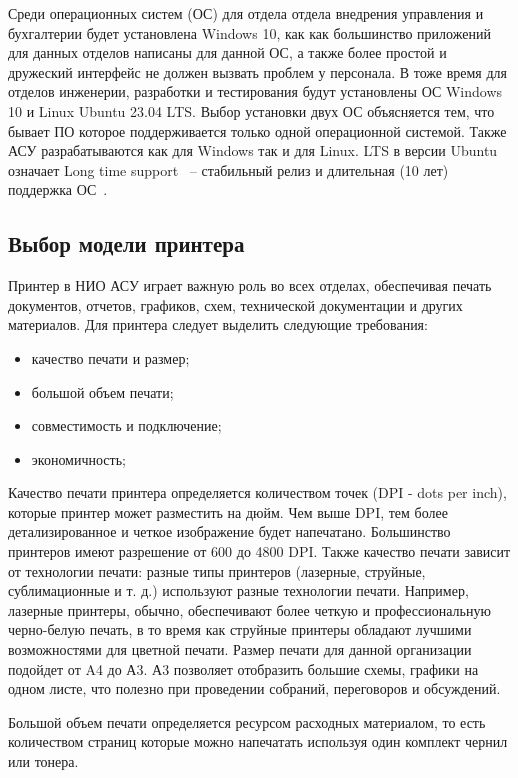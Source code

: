 Среди операционных систем (ОС) для отдела отдела внедрения управления и бухгалтерии будет установлена Windows 10, как как большинство приложений для данных 
отделов написаны для данной ОС, а также более простой и дружеский интерфейс не должен вызвать проблем у персонала. 
В тоже время для отделов инженерии, разработки и тестирования будут установлены ОС Windows 10 и Linux Ubuntu 23.04 LTS. Выбор установки двух ОС объясняется тем,
что бывает ПО которое поддерживается только одной операционной системой. Также АСУ разрабатываются как для Windows так и для Linux. LTS в версии Ubuntu означает 
Long time support ~-- стабильный релиз и длительная (10 лет) поддержка ОС~\cite{ubuntu}.

\subsection{Выбор модели принтера}

Принтер в НИО АСУ играет важную роль во всех отделах, 
обеспечивая печать документов, отчетов, графиков, схем, технической документации и других материалов.
Для принтера следует выделить следующие требования:

\begin{itemize}
    \item качество печати и размер;
    \item большой объем печати;
    \item совместимость и подключение;
    \item экономичность;
\end{itemize}

Качество печати принтера определяется количеством точек (DPI - dots per inch), которые принтер может разместить на дюйм. 
Чем выше DPI, тем более детализированное и четкое изображение будет напечатано. 
Большинство принтеров имеют разрешение от 600 до 4800 DPI. Также качество печати зависит от технологии печати: разные типы принтеров 
(лазерные, струйные, сублимационные и т. д.) используют разные технологии печати. Например, лазерные принтеры, обычно, обеспечивают 
более четкую и профессиональную черно-белую печать, в то время как струйные принтеры обладают лучшими возможностями для цветной печати.
Размер печати для данной организации подойдет от A4 до А3. А3 позволяет отобразить большие схемы, графики на одном листе, что полезно 
при проведении собраний, переговоров и обсуждений.

Большой объем печати определяется ресурсом расходных материалом, то есть количеством страниц которые можно напечатать используя один комплект 
чернил или тонера.

